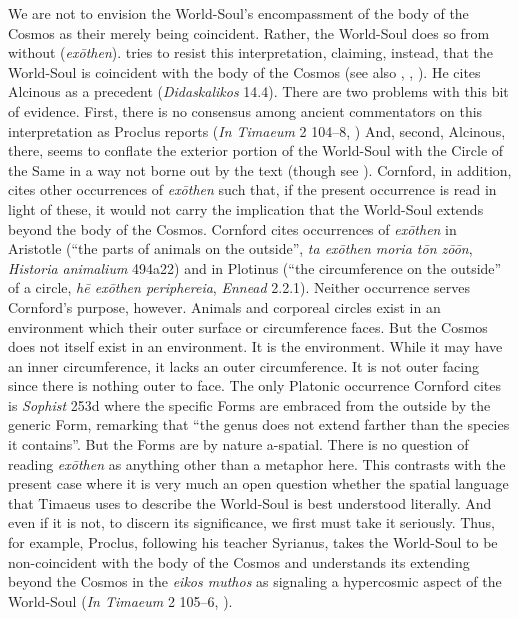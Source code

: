 We are not to envision the World-Soul's encompassment of the body of the Cosmos as their merely being coincident. Rather, the World-Soul does so from without (\emph{exōthen}). \citet[58]{Cornford:1935fk} tries to resist this interpretation, claiming, instead, that the World-Soul is coincident with the body of the Cosmos (see also \citealt[105]{Taylor:1928qb}, \citealt[85]{Skemp:1942oc}, \citealt[70]{Robinson:1970lq}). He cites Alcinous as a precedent (\emph{Didaska\-likos} 14.4). There are two problems with this bit of evidence. First, there is no consensus among ancient commentators on this interpretation as Proclus reports (\emph{In Timaeum} 2 104--8, \citealt{Diehl:1903re}) And, second, Alcinous, there, seems to conflate the exterior portion of the World-Soul with the Circle of the Same in a way not borne out by the text (though see \citealt[105]{Taylor:1928qb}). Cornford, in addition, cites other occurrences of \emph{exōthen} such that, if the present occurrence is read in light of these, it would not carry the implication that the World-Soul extends beyond the body of the Cosmos. Cornford cites occurrences of \emph{exōthen} in Aristotle (``the parts of animals on the outside'', \emph{ta exōthen moria tōn zōōn}, \emph{Historia animalium} 494a22) and in Plotinus (``the circumference on the outside'' of a circle, \emph{hē exōthen periphereia}, \emph{Ennead} 2.2.1). Neither occurrence serves Cornford's purpose, however. Animals and corporeal circles exist in an environment which their outer surface or circumference faces. But the Cosmos does not itself exist in an environment. It is the environment. While it may have an inner circumference, it lacks an outer circumference. It is not outer facing since there is nothing outer to face. The only Platonic occurrence Cornford cites is \emph{Sophist} 253d where the specific Forms are embraced from the outside by the generic Form, remarking that ``the genus does not extend farther than the species it contains''. But the Forms are by nature a-spatial. There is no question of reading \emph{exōthen} as anything other than a metaphor here. This contrasts with the present case where it is very much an open question whether the spatial language that Timaeus uses to describe the World-Soul is best understood literally. And even if it is not, to discern its significance, we first must take it seriously. Thus, for example, Proclus, following his teacher Syrianus, takes the World-Soul to be non-coincident with the body of the Cosmos and understands its extending beyond the Cosmos in the \emph{eikos muthos} as signaling a hypercosmic aspect of the World-Soul (\emph{In Timaeum} 2 105--6, \citealt{Diehl:1903re}).

